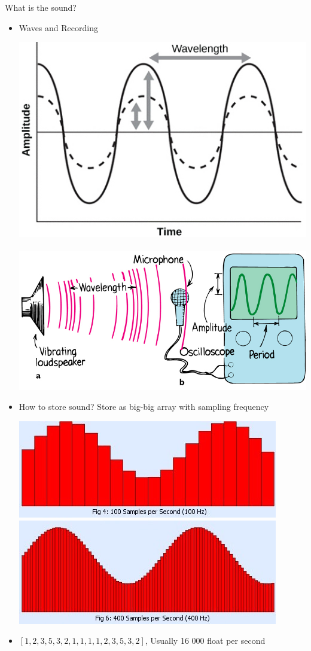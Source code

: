\documentclass{beamer}
\begin{document}
\begin{frame}{What is the sound?} 
	\begin{itemize}
		\item     Waves and Recording
		\begin{center}		  
			 \includegraphics[scale=0.25]{img/wave} ~~~    	\includegraphics[scale=0.2]{img/sound}
		\end{center}
		\item     How to store sound? Store as big-big array with sampling frequency
		\begin{center}
			 \includegraphics[scale=0.35]{img/sf1}~~~~   \includegraphics[scale=0.35]{img/sf2} 
		\end{center}
		\item    $[1, 2, 3, 5, 3, 2, 1, 1, 1, 1, 2, 3, 5, 3, 2]$,   Usually 16 000 float per second
	\end{itemize}
\end{frame}
\end{document}
